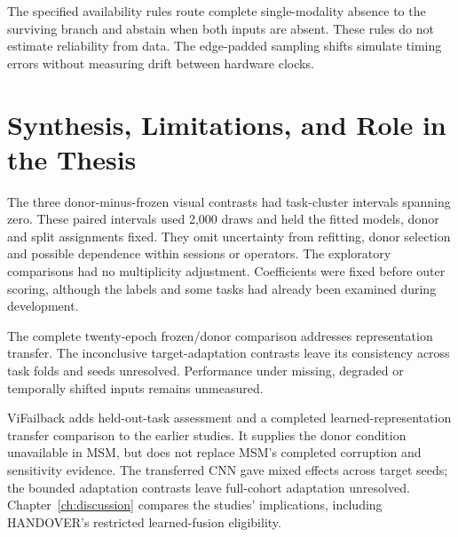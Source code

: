 The specified availability rules route complete single-modality absence to the surviving
branch and abstain when both inputs are absent. These rules do not estimate reliability
from data. The edge-padded sampling shifts simulate timing errors without measuring
drift between hardware clocks.


\section{Synthesis, Limitations, and Role in the Thesis}
The three donor-minus-frozen visual contrasts had task-cluster intervals spanning zero.
These paired intervals used 2,000 draws and held the fitted models, donor and split
assignments fixed. They omit uncertainty from refitting, donor selection and possible
dependence within sessions or operators. The exploratory comparisons had no multiplicity
adjustment. Coefficients were fixed before outer scoring, although the labels and some
tasks had already been examined during development.

The complete twenty-epoch frozen/donor comparison addresses representation transfer. The
inconclusive target-adaptation contrasts leave its consistency across task folds and
seeds unresolved. Performance under missing, degraded or temporally shifted inputs
remains unmeasured.

ViFailback adds held-out-task assessment and a completed learned-representation
transfer comparison to the earlier studies. It supplies the donor condition unavailable
in MSM, but does not replace MSM's completed corruption and sensitivity evidence.
The transferred CNN gave mixed effects across target seeds; the bounded adaptation
contrasts leave full-cohort adaptation unresolved. Chapter~\ref{ch:discussion} compares
the studies' implications, including HANDOVER's restricted learned-fusion eligibility.
